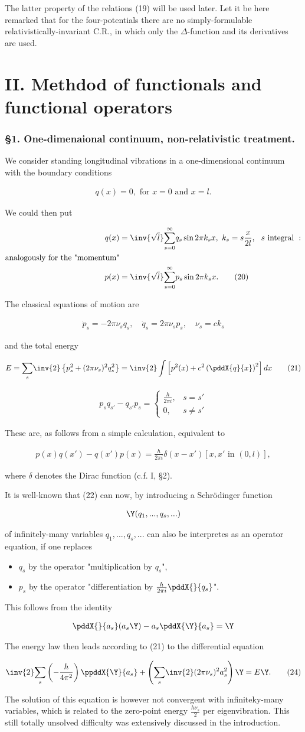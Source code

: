 \documentclass{article}
\newcommand{\nequ}[2]{
\begin{align*}
#1
\tag{#2}
\end{align*}
}
\newcommand{\uequ}[1]{
\begin{align*}
#1
\end{align*}
}
\newcommand{\sumXY}[2]{\underset{#1}{\overset{#2}{\sum}}}
\newcommand{\sumX}[1]{\underset{#1}{\sum}}
\begin{document}
The latter property of the relations (19) will be used later. Let it be here remarked that for the four-potentials there are no simply-formulable relativistically-invariant C.R., in which only the $\Delta$-function and its derivatives are used.

\part*{II. Methdod of functionals and functional operators}

\section*{§1. One-dimenaional continuum, non-relativistic treatment.}

We consider standing longitudinal vibrations in a one-dimensional continuum with the boundary conditions
\uequ{
q(x)=0, \text{ for } x=0 \text{ and } x=l.
}
We could then put
\nequ{
q(x) &= \inv{\sqrt{l}}\sumXY{s=0}{\infty}q_s \sin{2\pi k_s x},\,\,
k_s = s\frac{x}{2l},\,\,\text{ $s$ integral }:\\
\text{analogously for the "momentum"}&\\
p(x) &= \inv{\sqrt{l}}\sumXY{s=0}{\infty}p_s \sin{2\pi k_s x}.
}{20}
The classical equations of motion are
\uequ{
\dot{p}_s = -2\pi\nu_s q_s,\quad \dot{q}_s = 2\pi\nu_s p_s,\quad \nu_s = ck_s
}
and the total energy
\nequ{
E=\sumX{s}\inv{2}\left\{
p_s^2 + (2\pi\nu_s)^2 q_s^2
\right\} = \inv{2}\int\left[
p^2(x) + c^2\left(\pddX{q}{x}\right)^2
\right]dx
}{21}
\nequ{
p_s q_{s'} - q_{s'}p_s = \begin{cases} 
      \frac{h}{2\pi i}, & s = s' \\
      0, & s \neq s'
   \end{cases}
}{22}
These are, as follows from a simple calculation, equivalent to
\nequ{
p(x)q(x') - q(x')p(x) = \frac{h}{2\pi i}\delta(x-x')[x,x' \text{ in } (0,l)],
}{23}
where $\delta$ denotes the Dirac function (c.f. I, §2).

It is well-known that (22) can now, by introducing a Schrödinger function
\uequ{
\Y(q_1,...,q_s,...)
}
of infinitely-many variables $q_1,...,q_s,...$ can also be interpretes as an operator equation, if one replaces
\begin{itemize}
  \item $q_s$ by the operator "multiplication by $q_s$",
  \item $p_s$ by the operator "differentiation by $\frac{h}{2\pi i}\pddX{}{q_s}$".
\end{itemize}
This follows from the identity
\uequ{
\pddX{}{a_s}(a_s\Y) - a_s\pddX{\Y}{a_s} = \Y
}
The energy law then leads according to (21) to the differential equation
\nequ{
\inv{2}\sumX{s}\left(-\frac{h}{4\pi^2}\right)\ppddX{\Y}{a_s}
+ \left(\sumX{s}\inv{2}(2\pi\nu_s)^2 a_s^2 \right)\Y = E\Y.
}{24}
The solution of this equation is however not convergent with infiniteky-many variables, which is related to the zero-point energy $\frac{h\nu_s}{2}$ per eigenvibration. This still totally unsolved difficulty was extensively discussed in the introduction.
\end{document}
